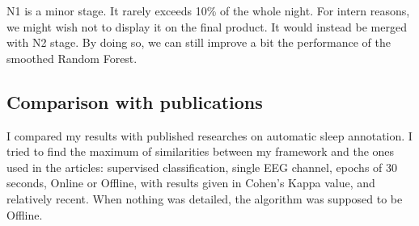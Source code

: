 \documentclass[12pt]{report}
\begin{document}
N1 is a minor stage. It rarely exceeds 10\% of the whole night. For intern reasons, we might wish not to display it on the final product. It would instead be merged with N2 stage. By doing so, we can still improve a bit the performance of the smoothed Random Forest.

\begin{table}[H]
\centering
{}
\caption{\label{tab:perf_non1}Performance of the RF classifier for the 4-class problem}
\end{table}

\subsection{Comparison with publications}

I compared my results with published researches on automatic sleep annotation. I tried to find the maximum of similarities between my framework and the ones used in the articles: supervised classification, single EEG channel, epochs of 30 seconds, Online or Offline, with results given in Cohen's Kappa value, and relatively recent. When nothing was detailed, the algorithm was supposed to be Offline.
\end{document}
